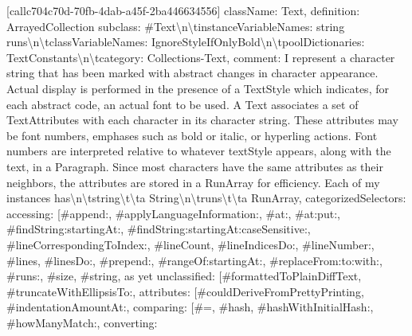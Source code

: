 { {[}call\textunderscore c704c70d-70fb-4dab-a45f-2ba446634556{]} \textbraceleft \textquotedbl{}className\textquotedbl{}: \textquotedbl{}Text\textquotedbl{}, \textquotedbl{}definition\textquotedbl{}: \textquotedbl{}ArrayedCollection subclass: \#Text\allowbreak\textbackslash n\allowbreak\textbackslash tinstanceVariableNames: \textquotesingle{}string runs\textquotesingle{}\allowbreak\textbackslash n\allowbreak\textbackslash tclassVariableNames: \textquotesingle{}IgnoreStyleIfOnlyBold\textquotesingle{}\allowbreak\textbackslash n\allowbreak\textbackslash tpoolDictionaries: \textquotesingle{}TextConstants\textquotesingle{}\allowbreak\textbackslash n\allowbreak\textbackslash tcategory: \textquotesingle{}Collections-Text\textquotesingle{}\textquotedbl{}, \textquotedbl{}comment\textquotedbl{}: \textquotedbl{}I represent a character string that has been marked with abstract changes in character appearance. Actual display is performed in the presence of a TextStyle which indicates, for each abstract code, an actual font to be used.  A Text associates a set of TextAttributes with each character in its character string.  These attributes may be font numbers, emphases such as bold or italic, or hyperling actions.  Font numbers are interpreted relative to whatever textStyle appears, along with the text, in a Paragraph.  Since most characters have the same attributes as their neighbors, the attributes are stored in a RunArray for efficiency.  Each of my instances has\allowbreak\textbackslash n\allowbreak\textbackslash tstring\allowbreak\textbackslash t\allowbreak\textbackslash ta String\allowbreak\textbackslash n\allowbreak\textbackslash truns\allowbreak\textbackslash t\allowbreak\textbackslash ta RunArray\textquotedbl{}, \textquotedbl{}categorizedSelectors\textquotedbl{}: \textbraceleft \textquotedbl{}accessing\textquotedbl{}: {[}\textquotedbl{}\#append:\textquotedbl{}, \textquotedbl{}\#applyLanguageInformation:\textquotedbl{}, \textquotedbl{}\#at:\textquotedbl{}, \textquotedbl{}\#at:put:\textquotedbl{}, \textquotedbl{}\#findString:startingAt:\textquotedbl{}, \textquotedbl{}\#findString:startingAt:caseSensitive:\textquotedbl{}, \textquotedbl{}\#lineCorrespondingToIndex:\textquotedbl{}, \textquotedbl{}\#lineCount\textquotedbl{}, \textquotedbl{}\#lineIndicesDo:\textquotedbl{}, \textquotedbl{}\#lineNumber:\textquotedbl{}, \textquotedbl{}\#lines\textquotedbl{}, \textquotedbl{}\#linesDo:\textquotedbl{}, \textquotedbl{}\#prepend:\textquotedbl{}, \textquotedbl{}\#rangeOf:startingAt:\textquotedbl{}, \textquotedbl{}\#replaceFrom:to:with:\textquotedbl{}, \textquotedbl{}\#runs:\textquotedbl{}, \textquotedbl{}\#size\textquotedbl{}, \textquotedbl{}\#string\textquotedbl{}{]}, \textquotedbl{}as yet unclassified\textquotedbl{}: {[}\textquotedbl{}\#formattedToPlainDiffText\textquotedbl{}, \textquotedbl{}\#truncateWithEllipsisTo:\textquotedbl{}{]}, \textquotedbl{}attributes\textquotedbl{}: {[}\textquotedbl{}\#couldDeriveFromPrettyPrinting\textquotedbl{}, \textquotedbl{}\#indentationAmountAt:\textquotedbl{}{]}, \textquotedbl{}comparing\textquotedbl{}: {[}\textquotedbl{}\#=\textquotedbl{}, \textquotedbl{}\#hash\textquotedbl{}, \textquotedbl{}\#hashWithInitialHash:\textquotedbl{}, \textquotedbl{}\#howManyMatch:\textquotedbl{}{]}, \textquotedbl{}converting\textquotedbl{}: }
